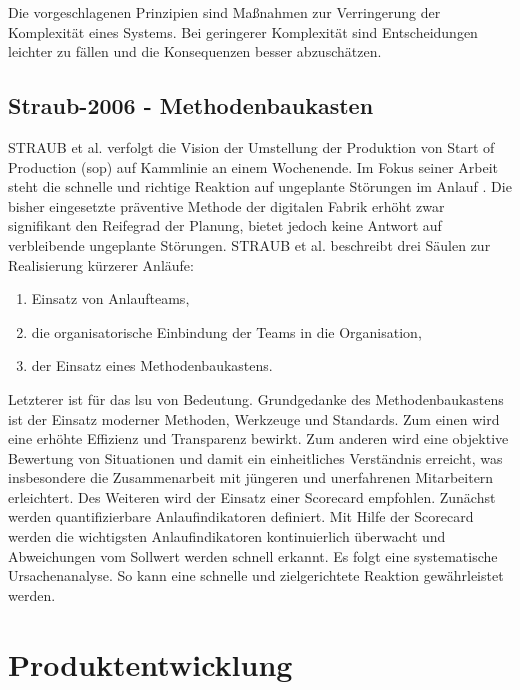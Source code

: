 
Die vorgeschlagenen Prinzipien sind Maßnahmen zur Verringerung der Komplexität eines Systems. Bei geringerer Komplexität sind Entscheidungen leichter zu fällen und die Konsequenzen besser abzuschätzen. 

\subsection*{Straub-2006 - Methodenbaukasten}

STRAUB et al. verfolgt die Vision der Umstellung der Produktion von Start of Production (\gls{sop}) 
auf Kammlinie an einem Wochenende. Im Fokus seiner Arbeit steht die schnelle und richtige Reaktion auf ungeplante Störungen im Anlauf \autocite{Straub2006}. Die bisher eingesetzte präventive Methode der digitalen Fabrik erhöht zwar signifikant den Reifegrad der Planung, bietet jedoch keine Antwort auf verbleibende ungeplante Störungen. STRAUB et al. beschreibt drei Säulen zur Realisierung kürzerer Anläufe: 
\begin{enumerate}
 \item Einsatz von Anlaufteams, 
 \item die organisatorische Einbindung der Teams in die Organisation,
 \item der Einsatz eines Methodenbaukastens. 
\end{enumerate}
Letzterer ist für das \gls{lsu} von Bedeutung. 
Grundgedanke des Methodenbaukastens ist der Einsatz moderner Methoden, Werkzeuge und Standards.
Zum einen wird eine erhöhte Effizienz und Transparenz bewirkt. Zum anderen wird eine objektive Bewertung von Situationen und damit ein einheitliches Verständnis erreicht, was insbesondere die Zusammenarbeit mit jüngeren und unerfahrenen Mitarbeitern erleichtert. 
Des Weiteren wird der Einsatz einer Scorecard empfohlen. 
Zunächst werden quantifizierbare Anlaufindikatoren definiert. Mit Hilfe der Scorecard werden die wichtigsten Anlaufindikatoren kontinuierlich überwacht und Abweichungen vom Sollwert werden schnell erkannt. Es folgt eine systematische Ursachenanalyse. So kann eine schnelle und zielgerichtete Reaktion gewährleistet werden. 


\section{Produktentwicklung}
